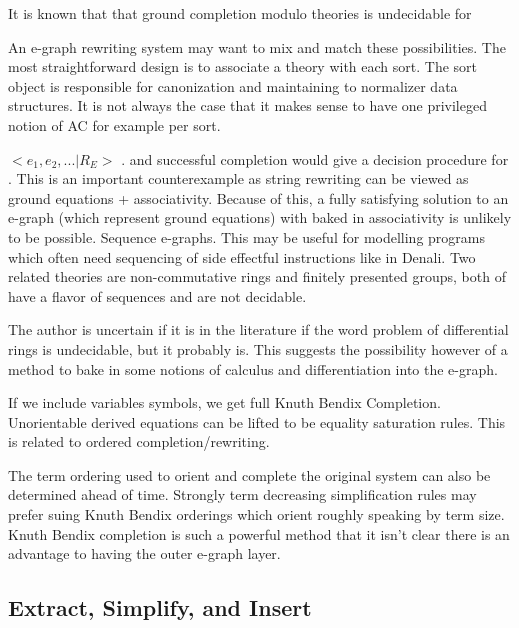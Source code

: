 

It is known that \cite{MARCHE1996253} that ground completion modulo theories is undecidable for

An e-graph rewriting system may want to mix and match these possibilities. The most straightforward design is to associate a theory with each sort. 
The sort object is responsible for canonization and maintaining to normalizer data structures.
 It is not always the case that it makes sense to have one privileged notion of AC for example per sort.


$<e_1, e_2, ... | R_E>$ .
and successful completion would give a decision procedure for . This is an important counterexample as string rewriting can be viewed as ground equations + associativity. Because of this, 
a fully satisfying solution to an e-graph (which represent ground equations) with baked in associativity is unlikely to be possible. 
Sequence e-graphs. This may be useful for modelling programs which often need sequencing of side effectful instructions like in Denali. 
Two related theories are non-commutative rings and finitely presented groups, both of have a flavor of sequences and are not decidable. 
\item The author is uncertain if it is in the literature if the word problem of differential rings is undecidable, but it probably is. 
This suggests the possibility however of a method to bake in some notions of calculus and differentiation into the e-graph.

 If we include variables symbols, we get full Knuth Bendix Completion.
 Unorientable derived equations can be lifted to be equality saturation rules. This is related to ordered completion/rewriting.


 The term ordering used to orient and complete the original system can also be determined ahead of time. Strongly term decreasing simplification rules may prefer suing Knuth Bendix orderings which orient roughly speaking by term size. Knuth Bendix completion is such a powerful method that it isn't clear there is an advantage to having the outer e-graph layer.

\subsection{Extract, Simplify, and Insert}

